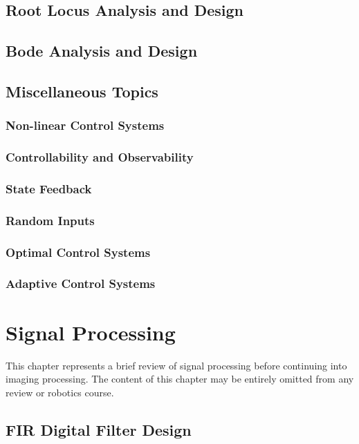 \documentclass[11pt]{book}
\theoremstyle{example}
\begin{document}
\section{Root Locus Analysis and Design}

\section{Bode Analysis and Design}

\section{Miscellaneous Topics}

\subsection{Non-linear Control Systems}

\subsection{Controllability and Observability}

\subsection{State Feedback}

\subsection{Random Inputs}

\subsection{Optimal Control Systems}

\subsection{Adaptive Control Systems}

\chapter{Signal Processing}

This chapter represents a brief review of signal processing before continuing into imaging processing. The content of this chapter may be entirely omitted from any review or robotics course.

\section{FIR Digital Filter Design}
\end{document}
